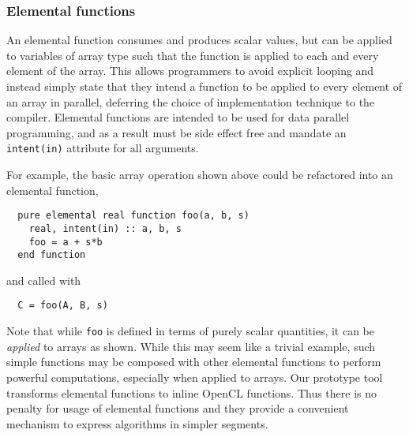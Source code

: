 \subsubsection*{Elemental functions}

An elemental function consumes and produces scalar values, but can be applied
to variables of array type such that the function is applied to each and every
element of the array.  This allows programmers to avoid explicit looping and
instead simply state that they intend a function to be applied to every
element of an array in parallel, deferring the choice of implementation
technique to the compiler.  Elemental functions are intended to be used for
data parallel programming, and as a result must be side effect free and
mandate an {\tt intent(in)} attribute for all arguments.


For example, the basic array operation shown above could be refactored into
an elemental function,

{\small
\begin{verbatim}
  pure elemental real function foo(a, b, s)
    real, intent(in) :: a, b, s
    foo = a + s*b
  end function
\end{verbatim}
}

\noindent and called with

{\small
\begin{verbatim}
  C = foo(A, B, s)
\end{verbatim}
}

Note that while {\tt foo} is defined in terms of purely scalar
quantities, it can be \emph{applied} to arrays as shown.  While this
may seem like a trivial example, such simple functions may be composed
with other elemental functions to perform powerful computations,
especially when applied to arrays.  Our prototype tool transforms
elemental functions to inline OpenCL functions.  Thus there is no
penalty for usage of elemental functions and they provide a convenient
mechanism to express algorithms in simpler segments.


